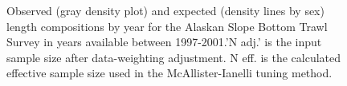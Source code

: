\documentclass[
]{scrartcl}
\begin{document}
\begin{figure}[H]


\caption{\label{fig-len-fit-akslope}Observed (gray density plot) and
expected (density lines by sex) length compositions by year for the
Alaskan Slope Bottom Trawl Survey in years available between
1997-2001.'N adj.' is the input sample size after data-weighting
adjustment. N eff. is the calculated effective sample size used in the
McAllister-Ianelli tuning method.}

\end{figure}%
\end{document}
